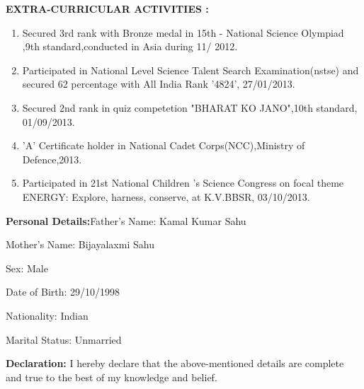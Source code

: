 \documentclass[a4]{article}
\begin{document}
\vspace{3mm}
\textbf{EXTRA-CURRICULAR ACTIVITIES : } 
\begin{enumerate}
	\item Secured 3rd rank with Bronze medal in 15th - National Science Olympiad ,9th standard,conducted in Asia during 11/ 2012.
        \item Participated in National Level Science Talent Search Examination(nstse) and secured 62 percentage with All India Rank '4824', 27/01/2013.
	\item Secured 2nd rank in quiz competetion "BHARAT KO JANO",10th standard, 01/09/2013.
        \item 'A' Certificate holder in National Cadet Corps(NCC),Ministry of Defence,2013.
        \item Participated in 21st National Children 's Science Congress on focal theme ENERGY: Explore, harness, conserve, at K.V.BBSR, 03/10/2013.
        
\end{enumerate}

\vspace{3mm}
\textbf{Personal Details:}\hspace{.4cm}Father's Name: Kamal Kumar Sahu

\hspace{3.4cm}Mother's Name: Bijayalaxmi Sahu

\hspace{3.4cm}Sex: Male

\hspace{3.4cm}Date of Birth: 29/10/1998

\hspace{3.4cm}Nationality: Indian

\hspace{3.4cm}Marital Status: Unmarried

\vspace{3mm}
\textbf{Declaration: }I hereby declare that the above-mentioned details are complete and true to the best of my knowledge and belief.
\end{document}

